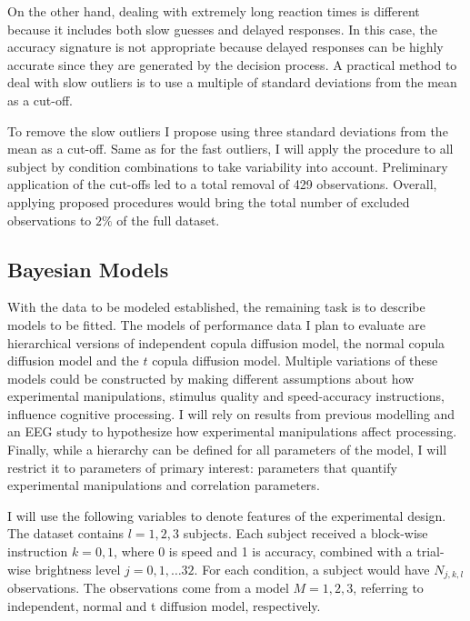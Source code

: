 \documentclass[12pt]{report}
\begin{document}
On the other hand, dealing with extremely long reaction times is different because it includes both slow guesses and delayed responses. In this case, the accuracy signature is not appropriate because delayed responses can be highly accurate since they are generated by the decision process. A practical method to deal with slow outliers is to use a multiple of standard deviations from the mean as a cut-off.

To remove the slow outliers I propose using three standard deviations from the mean as a cut-off. Same as for the fast outliers, I will apply the procedure to all subject by condition combinations to take variability into account. Preliminary application of the cut-offs led to a total removal of 429 observations. Overall, applying proposed procedures would bring the total number of excluded observations to $2\%$ of the full dataset.

\subsection{Bayesian Models}

With the data to be modeled established, the remaining task is to describe models to be fitted. The models of performance data I plan to evaluate are hierarchical versions of independent copula diffusion model, the normal
copula diffusion model and the $t$ copula
diffusion model. Multiple variations of these
models could be constructed by making different assumptions about how experimental manipulations, stimulus quality and speed-accuracy instructions, influence cognitive processing. I will rely on results from previous modelling and an EEG study to hypothesize how experimental manipulations affect processing. Finally, while a hierarchy can be defined for all parameters of the model, I will restrict it to parameters of primary interest: parameters that quantify experimental manipulations and correlation parameters. 

I will use the following variables to denote features of the experimental design. The dataset contains $l = 1, 2, 3$ subjects. Each subject received a block-wise instruction $k = 0, 1$, where 0 is speed and 1 is accuracy, combined with a trial-wise brightness level $j = 0, 1, \ldots 32$. For each condition, a subject would have $N_{j,k,l}$ observations. The observations come from a model $M = 1, 2, 3$, referring to independent, normal and t diffusion model, respectively. 
\end{document}

